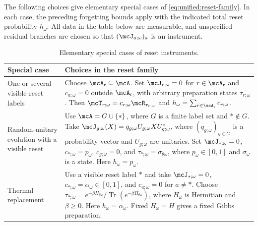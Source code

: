 \documentclass[a4paper]{article}
\numberwithin{equation}{section}   %
\theoremstyle{plain}   %
\theoremstyle{plain}   %
\theoremstyle{examplestyle}
\begin{document}
    The following choices give elementary special cases of \eqref{eq:unified:reset-family}. 
    In each case, the preceding forgetting bounds apply with the indicated total reset probability $h_\omega$.
    All data in the table below are measurable, and unspecified residual branches are chosen so that $(\mcJ_{a;\omega})_a$ is an instrument.

    \begin{table}[htbp]
    \centering
    \small
    \renewcommand{\arraystretch}{1.25}
    \caption{Elementary special cases of reset instruments.}
    \label{tab:reset-special-cases}
    \begin{tabularx}{\linewidth}{
        @{}>{\raggedright\arraybackslash}p{.24\linewidth}
        >{\raggedright\arraybackslash}X@{}
    }
    \toprule
    Special case & Choices in the reset family \\
    \midrule
    
    One or several visible reset labels
    &
    Choose $\mcA_{\mathrm r}\subseteq\mcA$.
    Set $\mcJ_{r;\omega}=0$ for
    $r\in\mcA_{\mathrm r}$ and $c_{a;\omega}=0$ outside
    $\mcA_{\mathrm r}$, with arbitrary preparation states
    $\tau_{r;\omega}$.
    Then
    $\mcT_{r;\omega}
     =c_{r;\omega}\mcR_{\tau_{r;\omega}}$
    and
    $h_\omega=\sum_{r\in\mcA_{\mathrm r}}c_{r;\omega}$.
    \\
    \addlinespace
    
    Random-unitary evolution with a visible reset
    &
    Use $\mcA=G\cup\{*\}$, where $G$ is a finite label set
    and $*\notin G$.
    Take
    $\mcJ_{g;\omega}(X)
     =q_{g;\omega}U_{g;\omega}XU_{g;\omega}^*$,
    where $(q_{g;\omega})_{g\in G}$ is a probability vector
    and $U_{g;\omega}$ are unitaries.
    Set
    $\mcJ_{*;\omega}=0$,
    $c_{*;\omega}=p_\omega$,
    $c_{g;\omega}=0$, and
    $\tau_{*;\omega}=\sigma_{\theta\omega}$,
    where $p_\omega\in[0,1]$ and $\sigma_\omega$ is a state.
    Here $h_\omega=p_\omega$.
    \\
    \addlinespace
    
    Thermal replacement
    &
    Use a visible reset label $*$ and take
    $\mcJ_{*;\omega}=0$,
    $c_{*;\omega}=\alpha_\omega\in[0,1]$, and
    $c_{a;\omega}=0$ for $a\ne *$.
    Choose
    $\tau_{*;\omega}
     =e^{-\beta H_{\theta\omega}}/
       \operatorname{Tr}(e^{-\beta H_{\theta\omega}})$,
    where $H_\omega$ is Hermitian and $\beta\ge0$.
    Here $h_\omega=\alpha_\omega$.
    Fixed $H_\omega=H$ gives a fixed Gibbs preparation.
    \\
    \bottomrule
    \end{tabularx}
    \end{table}
    
\end{document}
